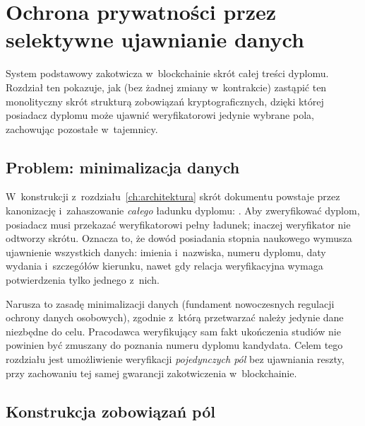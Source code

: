 \chapter{Ochrona prywatności przez selektywne ujawnianie danych}
\label{ch:prywatnosc}

System podstawowy zakotwicza w~blockchainie skrót całej treści dyplomu.
Rozdział ten pokazuje, jak (bez żadnej zmiany w~kontrakcie) zastąpić ten
monolityczny skrót strukturą zobowiązań kryptograficznych, dzięki której posiadacz
dyplomu może ujawnić weryfikatorowi jedynie wybrane pola, zachowując pozostałe
w~tajemnicy.

\section{Problem: minimalizacja danych}
\label{sec:priv-problem}

W~konstrukcji z~rozdziału~\ref{ch:architektura} skrót dokumentu powstaje przez
kanonizację i~zahaszowanie \emph{całego} ładunku dyplomu: .
Aby zweryfikować dyplom, posiadacz musi przekazać weryfikatorowi pełny ładunek;
inaczej weryfikator nie odtworzy skrótu. Oznacza to, że dowód posiadania stopnia
naukowego wymusza ujawnienie wszystkich danych: imienia i~nazwiska, numeru dyplomu,
daty wydania i~szczegółów kierunku, nawet gdy relacja weryfikacyjna wymaga
potwierdzenia tylko jednego z~nich.

Narusza to zasadę minimalizacji danych (fundament nowoczesnych regulacji ochrony
danych osobowych), zgodnie z~którą przetwarzać należy jedynie dane niezbędne do
celu. Pracodawca weryfikujący sam fakt ukończenia studiów nie powinien być zmuszany
do poznania numeru dyplomu kandydata. Celem tego rozdziału jest umożliwienie
weryfikacji \emph{pojedynczych pól} bez ujawniania reszty, przy zachowaniu tej samej
gwarancji zakotwiczenia w~blockchainie.

\section{Konstrukcja zobowiązań pól}
\label{sec:priv-zobowiazania}

